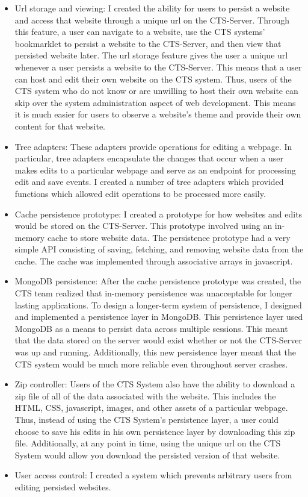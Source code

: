\documentclass[12pt]{article}
\begin{document}
\begin{itemize}
  \item Url storage and viewing: I created the ability for users to persist a website and access that website through a unique url on the CTS-Server. Through this feature, a user can navigate to a website, use the CTS systems' bookmarklet to persist a website to the CTS-Server, and then view that persisted website later. The url storage feature gives the user a unique url whenever a user persists a website to the CTS-Server. This means that a user can host and edit their own website on the CTS system. Thus, users of the CTS system who do not know or are unwilling to host their own website can skip over the system administration aspect of web development. This means it is much easier for users to observe a website's theme and provide their own content for that website.
  \item Tree adapters: These adapters provide operations for editing a webpage. In particular, tree adapters encapsulate the changes that occur when a user makes edits to a particular webpage and serve as an endpoint for processing edit and save events. I created a number of tree adapters which provided functions which allowed edit operations to be processed more easily.
  \item Cache persistence prototype: I created a prototype for how websites and edits would be stored on the CTS-Server. This prototype involved using an in-memory cache to store website data. The persistence prototype had a very simple API consisting of saving, fetching, and removing website data from the cache. The cache was implemented through associative arrays in javascript.
  \item MongoDB persistence: After the cache persistence prototype was created, the CTS team realized that in-memory persistence was unacceptable for longer lasting applications. To design a longer-term system of persistence, I designed and implemented a persistence layer in MongoDB. This persistence layer used MongoDB as a means to persist data across multiple sessions. This meant that the data stored on the server would exist whether or not the CTS-Server was up and running. Additionally, this new persistence layer meant that the CTS system would be much more reliable even throughout server crashes.
  \item Zip controller: Users of the CTS System also have the ability to download a zip file of all of the data associated with the website. This includes the HTML, CSS, javascript, images, and other assets of a particular webpage. Thus, instead of using the CTS System's persistence layer, a user could choose to save his edits in his own persistence layer by downloading this zip file. Additionally, at any point in time, using the unique url on the CTS System would allow you download the persisted version of that website.
  \item User access control: I created a system which prevents arbitrary users from editing persisted websites.
\end{itemize}
\end{document}
